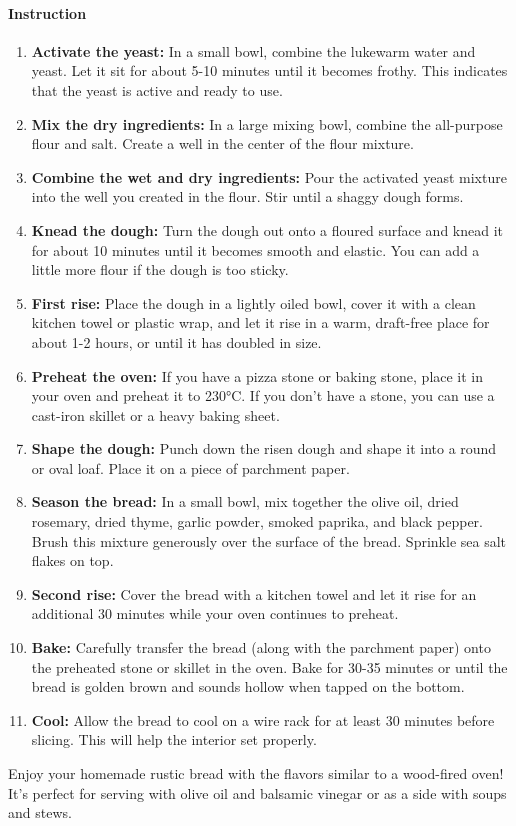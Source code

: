 \paragraph{Instruction}
\begin{enumerate}[noitemsep]
	\item \textbf{Activate the yeast:} In a small bowl, combine the lukewarm water and yeast. Let it sit for about 5-10 minutes until it becomes frothy. This indicates that the yeast is active and ready to use.
	\item \textbf{Mix the dry ingredients:} In a large mixing bowl, combine the all-purpose flour and salt. Create a well in the center of the flour mixture.
	\item \textbf{Combine the wet and dry ingredients:} Pour the activated yeast mixture into the well you created in the flour. Stir until a shaggy dough forms.
	\item \textbf{Knead the dough:} Turn the dough out onto a floured surface and knead it for about 10 minutes until it becomes smooth and elastic. You can add a little more flour if the dough is too sticky.
	\item \textbf{First rise:} Place the dough in a lightly oiled bowl, cover it with a clean kitchen towel or plastic wrap, and let it rise in a warm, draft-free place for about 1-2 hours, or until it has doubled in size.
	\item \textbf{Preheat the oven:} If you have a pizza stone or baking stone, place it in your oven and preheat it to 230°C. If you don't have a stone, you can use a cast-iron skillet or a heavy baking sheet.
	\item \textbf{Shape the dough:} Punch down the risen dough and shape it into a round or oval loaf. Place it on a piece of parchment paper.
	\item \textbf{Season the bread:} In a small bowl, mix together the olive oil, dried rosemary, dried thyme, garlic powder, smoked paprika, and black pepper. Brush this mixture generously over the surface of the bread. Sprinkle sea salt flakes on top.
	\item \textbf{Second rise:} Cover the bread with a kitchen towel and let it rise for an additional 30 minutes while your oven continues to preheat.
	\item \textbf{Bake:} Carefully transfer the bread (along with the parchment paper) onto the preheated stone or skillet in the oven. Bake for 30-35 minutes or until the bread is golden brown and sounds hollow when tapped on the bottom.
	\item \textbf{Cool:} Allow the bread to cool on a wire rack for at least 30 minutes before slicing. This will help the interior set properly.
\end{enumerate}
Enjoy your homemade rustic bread with the flavors similar to a wood-fired oven! It's perfect for serving with olive oil and balsamic vinegar or as a side with soups and stews.
\clearpage
